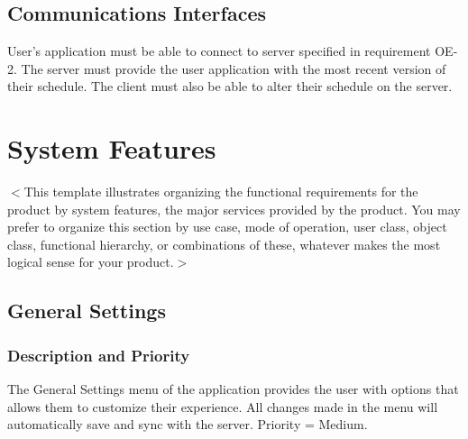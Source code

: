 \documentclass{scrreprt}
\begin{document}
\section{Communications Interfaces}
User's application must be able to connect to server specified in requirement OE-2.
The server must provide the user application with the most recent version of their
schedule. The client must also be able to alter their schedule on the server.


\chapter{System Features}
$<$This template illustrates organizing the functional requirements for the
product by system features, the major services provided by the product. You may
prefer to organize this section by use case, mode of operation, user class,
object class, functional hierarchy, or combinations of these, whatever makes the
most logical sense for your product.$>$

\section{General Settings}

\subsection{Description and Priority}
The General Settings menu of the application provides the user with options that allows them to customize their experience. All changes made in the menu will automatically save and sync with the server. Priority = Medium.
\end{document}
